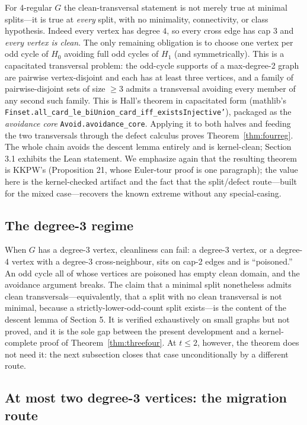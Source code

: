 \documentclass[11pt]{article}
\theoremstyle{definition}
\theoremstyle{remark}
\begin{document}
For 4-regular $G$ the clean-transversal statement is not merely true at minimal splits---it is true at \emph{every} split, with no minimality, connectivity, or class hypothesis. Indeed every vertex has degree $4$, so every cross edge has cap $3$ and \emph{every vertex is clean}. The only remaining obligation is to choose one vertex per odd cycle of $H_0$ avoiding full odd cycles of $H_1$ (and symmetrically). This is a capacitated transversal problem: the odd-cycle supports of a max-degree-2 graph are pairwise vertex-disjoint and each has at least three vertices, and a family of pairwise-disjoint sets of size $\ge 3$ admits a transversal avoiding every member of any second such family. This is Hall's theorem in capacitated form (mathlib's \texttt{Finset.all\_card\_le\_biUnion\_card\_iff\_existsInjective'}), packaged as the \emph{avoidance core} \texttt{Avoid.avoidance\_core}. Applying it to both halves and feeding the two transversals through the defect calculus proves Theorem~\ref{thm:fourreg}. The whole chain avoids the descent lemma entirely and is kernel-clean; Section 3.1 exhibits the Lean statement. We emphasize again that the resulting theorem is KKPW's (Proposition 21, whose Euler-tour proof is one paragraph); the value here is the kernel-checked artifact and the fact that the split/defect route---built for the mixed case---recovers the known extreme without any special-casing.

\subsection{The degree-3 regime}\label{26-deg3}

When $G$ has a degree-3 vertex, cleanliness can fail: a degree-3 vertex, or a degree-4 vertex with a degree-3 cross-neighbour, sits on cap-2 edges and is ``poisoned.'' An odd cycle all of whose vertices are poisoned has empty clean domain, and the avoidance argument breaks. The claim that a minimal split nonetheless admits clean transversals---equivalently, that a split with no clean transversal is not minimal, because a strictly-lower-odd-count split exists---is the content of the descent lemma of Section 5. It is verified exhaustively on small graphs but not proved, and it is the sole gap between the present development and a kernel-complete proof of Theorem~\ref{thm:threefour}. At $t \le 2$, however, the theorem does not need it: the next subsection closes that case unconditionally by a different route.

\subsection{At most two degree-3 vertices: the migration route}\label{27-t2-migration}
\end{document}
